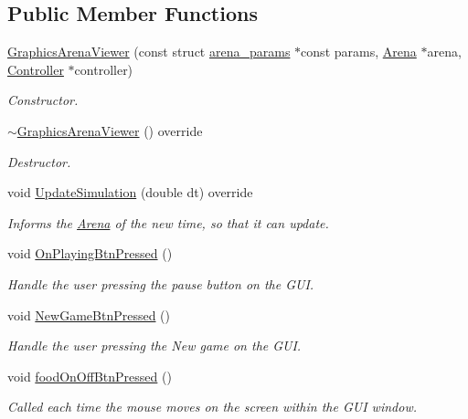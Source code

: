 \subsection*{Public Member Functions}
\begin{DoxyCompactItemize}
\item 
\mbox{\hyperlink{class_graphics_arena_viewer_a869510833897508300da65b1eb0c5d09}{Graphics\+Arena\+Viewer}} (const struct \mbox{\hyperlink{structarena__params}{arena\+\_\+params}} $\ast$const params, \mbox{\hyperlink{class_arena}{Arena}} $\ast$arena, \mbox{\hyperlink{class_controller}{Controller}} $\ast$controller)
\begin{DoxyCompactList}\small\item\em Constructor. \end{DoxyCompactList}\item 
\mbox{\hyperlink{class_graphics_arena_viewer_a88cea02aab1550a7f315fbf4f3868109}{$\sim$\+Graphics\+Arena\+Viewer}} () override
\begin{DoxyCompactList}\small\item\em Destructor. \end{DoxyCompactList}\item 
void \mbox{\hyperlink{class_graphics_arena_viewer_aeec66666382aa0312574d70aa58de250}{Update\+Simulation}} (double dt) override
\begin{DoxyCompactList}\small\item\em Informs the \mbox{\hyperlink{class_arena}{Arena}} of the new time, so that it can update. \end{DoxyCompactList}\item 
void \mbox{\hyperlink{class_graphics_arena_viewer_a7cc65fd0e2e8c1f6138608e398c7c887}{On\+Playing\+Btn\+Pressed}} ()
\begin{DoxyCompactList}\small\item\em Handle the user pressing the pause button on the G\+UI. \end{DoxyCompactList}\item 
void \mbox{\hyperlink{class_graphics_arena_viewer_a2f0a3c938191d5becda127e0ddf8bf25}{New\+Game\+Btn\+Pressed}} ()
\begin{DoxyCompactList}\small\item\em Handle the user pressing the New game on the G\+UI. \end{DoxyCompactList}\item 
void \mbox{\hyperlink{class_graphics_arena_viewer_a52f92251a44f82cf7ebf183ece199ceb}{food\+On\+Off\+Btn\+Pressed}} ()
\begin{DoxyCompactList}\small\item\em Called each time the mouse moves on the screen within the G\+UI window. \end{DoxyCompactList}\item 

\end{DoxyCompactItemize}
